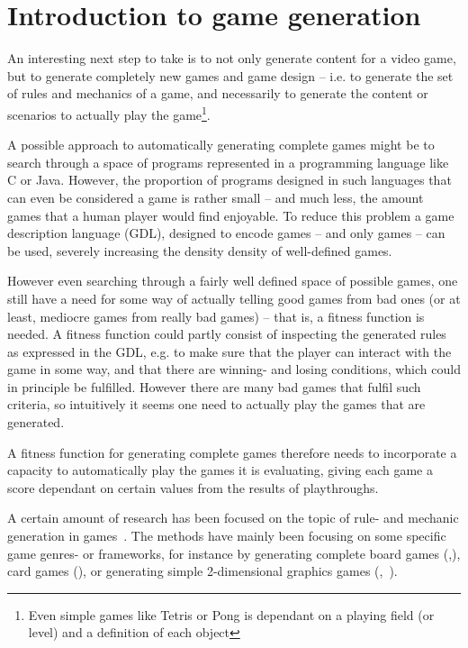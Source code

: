 \documentclass[a4paper,titlepage,final]{report}
\begin{document}

\section{Introduction to game generation}
\label{sec_introtogamegen}
An interesting next step to take is to not only generate content for a video game, but to generate completely new games and game design -- i.e. to generate the set of rules and mechanics of a game, and necessarily to generate the content or scenarios to actually play the game\footnote{Even simple games like Tetris or Pong is dependant on a playing field (or level) and a definition of each object}.

A possible approach to automatically generating complete games might be to search through a space of programs represented in a programming language like C or Java. 
However, the proportion of programs designed in such languages that can even be considered a game is rather small -- and much less, the amount games that a human player would find enjoyable.
To reduce this problem a game description language (GDL), designed to encode games -- and only games -- can be used, severely increasing the density density of well-defined games.

However even searching through a fairly well defined space of possible games, one still have a need for some way of actually telling good games from bad ones (or at least, mediocre games from really bad games) -- that is, a fitness function is needed. 
A fitness function could partly consist of inspecting the generated rules as expressed in the GDL, e.g. to make sure that the player can interact with the game in some way, and that there are winning- and losing conditions, which could in principle be fulfilled. 
However there are many bad games that fulfil such criteria, so intuitively it seems one need to actually play the games that are generated. 

A fitness function for generating complete games therefore needs to incorporate a capacity to automatically play the games it is evaluating, giving each game a score dependant on certain values from the results of playthroughs.

A certain amount of research has been focused on the topic of rule- and mechanic generation in games~\citep{pcgbook:ch6}.
The methods have mainly been focusing on some specific game genres- or frameworks, for instance by generating complete board games (\citep{pell1992metagame},\citep{browne2008automated}), card games (\citep{font2013towards}), or generating simple 2-dimensional graphics games (\citep{togelius2008experiment},~\citep{smith2010variations}).
\end{document}

